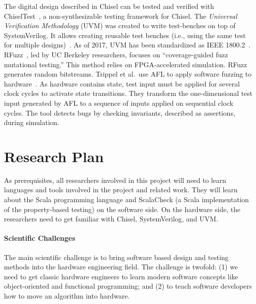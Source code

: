 \documentclass[fleqn,12pt]{article}
\begin{document}
The digital design described in Chisel can be tested and verified with
ChiselTest~\cite{chisel:tester2}, a non-synthesizable testing framework for Chisel.
The \textit{Universal Verification Methodology} (UVM) was created to write test-benches on top of SystemVerilog. 
It allows creating reusable test benches (i.e., using the same test for multiple designs)~\cite{uvm2015b}.
As of 2017, UVM has been standardized as IEEE 1800.2~\cite{IEEE:18002}.
RFuzz~\cite{rfuzz2018}, led by UC Berkeley researchers, focuses on ``coverage-guided fuzz mutational testing.''
This method relies on FPGA-accelerated simulation.
RFuzz generates random bitstreams.
Trippel et al.~use AFL to apply software fuzzing to hardware~\cite{DBLP:journals/corr/abs-2102-02308}.
As hardware contains state, test input must be applied for several clock cycles to activate state transitions.
They transform the one-dimensional test input generated by AFL to a sequence of inputs applied
on sequential clock cycles. The tool detects bugs by checking invariants, described as assertions, during simulation.

%


\section{Research Plan}

As prerequisites, all researchers involved in this project will need to learn
languages and tools involved in the project and related work.
They will learn about the Scala programming language and ScalaCheck
(a Scala implementation of the property-based testing) on the software side.
On the hardware side,
the researchers need to get familiar with Chisel, SystemVerilog, and
UVM.

\paragraph{Scientific Challenges}
The main scientific challenge is to bring software based design and testing methods into
the hardware engineering field. The challenge is twofold: (1) we need to get classic
hardware engineers to learn modern software concepts like object-oriented and functional
programming; and (2) to teach software developers how to move an algorithm into hardware.
\end{document}
